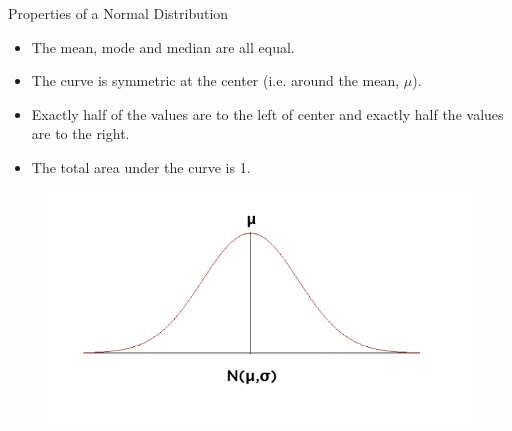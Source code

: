 \begin{frame}[t]{Properties of a Normal Distribution}
	\begin{itemize}
		\item The mean, mode and median are all equal.
		\item The curve is symmetric at the center (i.e. around the mean, 
		$\mu$).
		\item Exactly half of the values are to the left of center and exactly 
		half the values are to the right.
		\item The total area under the curve is 1.
	\end{itemize}

\begin{figure} [ht]
	\centering
	\includegraphics[trim={0 1cm 0 0}, clip, scale=0.4]{eda/nd3.png}
\end{figure}
\end{frame}

